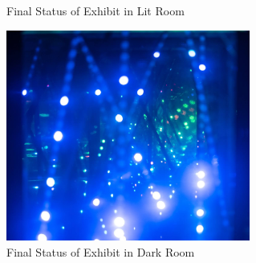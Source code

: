\documentclass{article}
\begin{document}
\begin{figure}
    \centering
    \caption{Final Status of Exhibit in Lit Room}
\end{figure}
\begin{figure}
    \centering
    \includegraphics[width=0.7143\textwidth]{dark.jpg}
    \caption{Final Status of Exhibit in Dark Room}
\end{figure}
\end{document}
